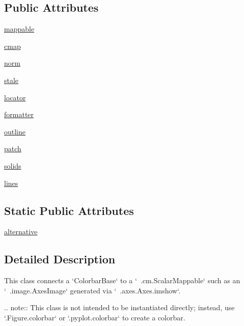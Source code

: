 \subsection*{Public Attributes}
\begin{DoxyCompactItemize}
\item 
\hyperlink{classmatplotlib_1_1colorbar_1_1Colorbar_ad7c20d86772ebdbeef4c890e15582852}{mappable}
\item 
\hyperlink{classmatplotlib_1_1colorbar_1_1Colorbar_a5bdcb0c2825bef8f0481fa134196607c}{cmap}
\item 
\hyperlink{classmatplotlib_1_1colorbar_1_1Colorbar_a6e0b3d2ddbbe3e9380e61dd812b597cb}{norm}
\item 
\hyperlink{classmatplotlib_1_1colorbar_1_1Colorbar_a6989f9fac95a5baae3b558c3b3f1e06f}{stale}
\item 
\hyperlink{classmatplotlib_1_1colorbar_1_1Colorbar_a4287b2fc9880df488f14d393609f1305}{locator}
\item 
\hyperlink{classmatplotlib_1_1colorbar_1_1Colorbar_aaf2904de762ad18d32196a89e9c1a769}{formatter}
\item 
\hyperlink{classmatplotlib_1_1colorbar_1_1Colorbar_a534f4ac7da3c25a9f6b96ba3773a2e1d}{outline}
\item 
\hyperlink{classmatplotlib_1_1colorbar_1_1Colorbar_a92b69c1c3fa0e1e80ac5b1c1c7c9a2aa}{patch}
\item 
\hyperlink{classmatplotlib_1_1colorbar_1_1Colorbar_adf048e6e4b1d6be1e392d07e7281e9b0}{solids}
\item 
\hyperlink{classmatplotlib_1_1colorbar_1_1Colorbar_af338fd689537c7d0c2afaef3e43de1de}{lines}
\end{DoxyCompactItemize}
\subsection*{Static Public Attributes}
\begin{DoxyCompactItemize}
\item 
\hyperlink{classmatplotlib_1_1colorbar_1_1Colorbar_a5acd00b6c4b82a162744a2a4e028d929}{alternative}
\end{DoxyCompactItemize}


\subsection{Detailed Description}
\begin{DoxyVerb}This class connects a `ColorbarBase` to a `~.cm.ScalarMappable`
such as an `~.image.AxesImage` generated via `~.axes.Axes.imshow`.

.. note::
    This class is not intended to be instantiated directly; instead, use
    `.Figure.colorbar` or `.pyplot.colorbar` to create a colorbar.
\end{DoxyVerb}
 


